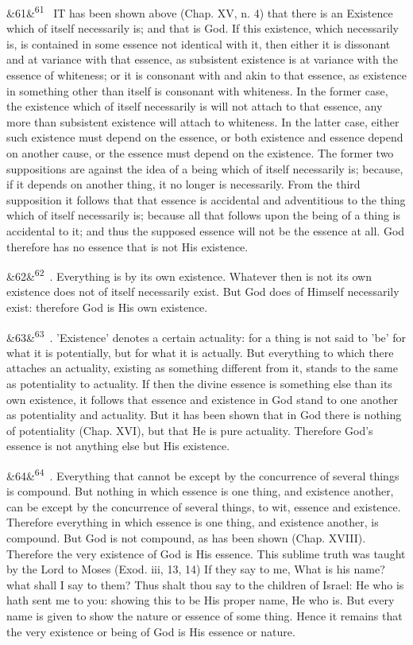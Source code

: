 \documentclass[12pt]{article}
\newcommand{\para}[1][]{\par\noindent\ifx&#1&\else\textsuperscript{\footnotesize #1}~\fi}
\begin{document}
\para[61] IT has been shown above (Chap. XV, n. 4) that there is an Existence which of itself necessarily is; and that is God. If this existence, which necessarily is, is contained in some essence not identical with it, then either it is dissonant and at variance with that essence, as subsistent existence is at variance with the essence of whiteness; or it is consonant with and akin to that essence, as existence in something other than itself is consonant with whiteness. In the former case, the existence which of itself necessarily is will not attach to that essence, any more than subsistent existence will attach to whiteness. In the latter case, either such existence must depend on the essence, or both existence and essence depend on another cause, or the essence must depend on the existence. The former two suppositions are against the idea of a being which of itself necessarily is; because, if it depends on another thing, it no longer is necessarily. From the third supposition it follows that that essence is accidental and adventitious to the thing which of itself necessarily is; because all that follows upon the being of a thing is accidental to it; and thus the supposed essence will not be the essence at all. God therefore has no essence that is not His existence.

\para[62] 2. Everything is by its own existence. Whatever then is not its own existence does not of itself necessarily exist. But God does of Himself necessarily exist: therefore God is His own existence.

\para[63] 4. 'Existence' denotes a certain actuality: for a thing is not said to 'be' for what it is potentially, but for what it is actually. But everything to which there attaches an actuality, existing as something different from it, stands to the same as potentiality to actuality. If then the divine essence is something else than its own existence, it follows that essence and existence in God stand to one another as potentiality and actuality. But it has been shown that in God there is nothing of potentiality (Chap. XVI), but that He is pure actuality. Therefore God's essence is not anything else but His existence.

\para[64] 5. Everything that cannot be except by the concurrence of several things is compound. But nothing in which essence is one thing, and existence another, can be except by the concurrence of several things, to wit, essence and existence. Therefore everything in which essence is one thing, and existence another, is compound. But God is not compound, as has been shown (Chap. XVIII). Therefore the very existence of God is His essence. This sublime truth was taught by the Lord to Moses (Exod. iii, 13, 14) If they say to me, What is his name? what shall I say to them? Thus shalt thou say to the children of Israel: He who is hath sent me to you: showing this to be His proper name, He who is. But every name is given to show the nature or essence of some thing. Hence it remains that the very existence or being of God is His essence or nature.
\end{document}
